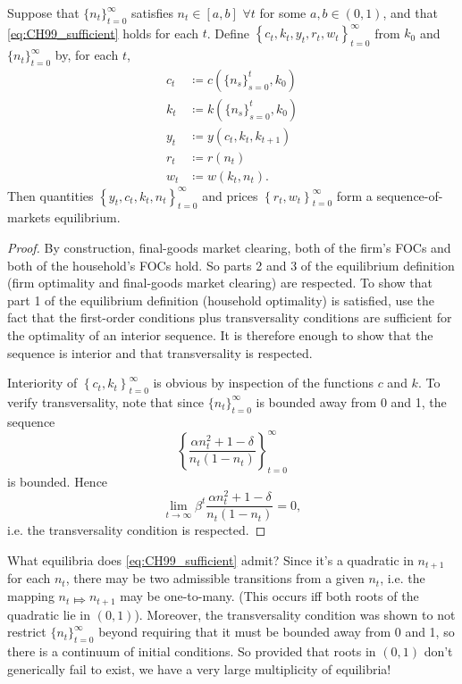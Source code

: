 \documentclass[11pt,letterpaper,reqno,oneside]{article}
\begin{document}
\begin{lemma}
	Suppose that $\{ n_t \}_{t=0}^\infty$ satisfies $n_t \in [a,b]$ $\forall t$ for some $a,b \in (0,1)$, and that \eqref{eq:CH99_sufficient} holds for each $t$. Define $\left\{ c_t, k_t, y_t, r_t, w_t \right\}_{t=0}^\infty$ from $k_0$ and $\{ n_t \}_{t=0}^\infty$ by, for each $t$,
	\begin{align*}
		c_t 
		&\coloneqq c\left(\{n_s\}_{s=0}^t,k_0\right)
		\\
		k_t
		&\coloneqq k\left(\{n_s\}_{s=0}^t,k_0\right)
		\\
		y_t 
		&\coloneqq y(c_t,k_t,k_{t+1}) 
		\\
		r_t 
		&\coloneqq r(n_t)
		\\
		w_t
		&\coloneqq w(k_t,n_t) .
	\end{align*}
	Then quantities $\left\{ y_t, c_t, k_t, n_t \right\}_{t=0}^\infty$ and prices $\left\{ r_t, w_t \right\}_{t=0}^\infty$ form a sequence-of-markets equilibrium.
\end{lemma}


\begin{proof}
	By construction, final-goods market clearing, both of the firm's FOCs and both of the household's FOCs hold. So parts 2 and 3 of the equilibrium definition (firm optimality and final-goods market clearing) are respected. To show that part 1 of the equilibrium definition (household optimality) is satisfied, use the fact that the first-order conditions plus transversality conditions are sufficient for the optimality of an interior sequence. It is therefore enough to show that the sequence is interior and that transversality is respected.

	Interiority of $\left\{ c_t, k_t \right\}_{t=0}^\infty$ is obvious by inspection of the functions $c$ and $k$. To verify transversality, note that since $\{ n_t \}_{t=0}^\infty$ is bounded away from 0 and 1, the sequence
	\begin{equation*}
		\left\{ \frac{ \alpha n_t^2 + 1 - \delta }
		{ n_t(1-n_t) } \right\}_{t=0}^\infty
	\end{equation*}
	is bounded. Hence
	\begin{equation*}
		\lim_{t\to\infty} \beta^t \frac{ \alpha n_t^2 + 1 - \delta }{ n_t(1-n_t) } = 0 ,
	\end{equation*}
	i.e. the transversality condition is respected.
\end{proof}


What equilibria does \cref{eq:CH99_sufficient} admit? Since it's a quadratic in $n_{t+1}$ for each $n_t$, there may be two admissible transitions from a given $n_t$, i.e. the mapping $n_t \Mapsto n_{t+1}$ may be one-to-many. (This occurs iff both roots of the quadratic lie in $(0,1)$). Moreover, the transversality condition was shown to not restrict $\{ n_t \}_{t=0}^\infty$ beyond requiring that it must be bounded away from 0 and 1, so there is a continuum of initial conditions. So provided that roots in $(0,1)$ don't generically fail to exist, we have a very large multiplicity of equilibria!
\end{document}
